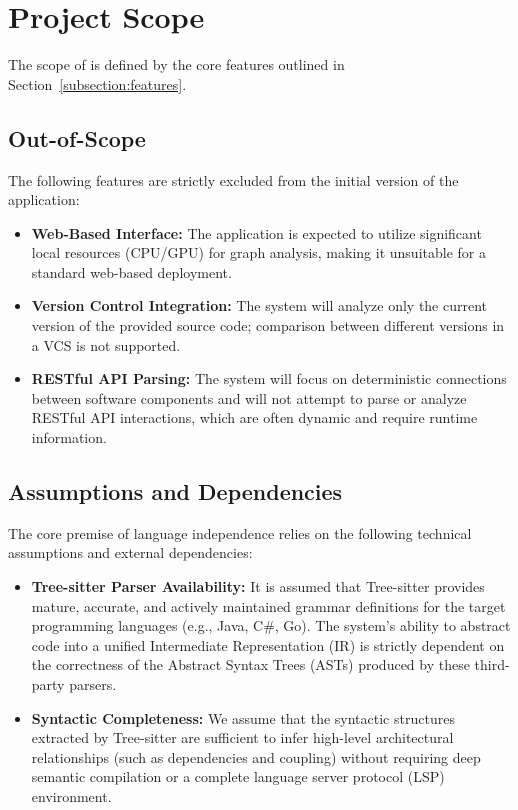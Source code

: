 \section{Project Scope}
\label{section:project-scope}

The scope of \textbf{\usevar{\srsNickName}} is defined by the core features outlined in Section~\ref{subsection:features}.

\subsection{Out-of-Scope}
The following features are strictly excluded from the initial version of the application:
\begin{itemize}
    \item \textbf{Web-Based Interface:} The application is expected to utilize significant local resources (CPU/GPU) for graph analysis, making it unsuitable for a standard web-based deployment.
    \item \textbf{Version Control Integration:} The system will analyze only the current version of the provided source code; comparison between different versions in a VCS is not supported.
    \item \textbf{RESTful API Parsing:} The system will focus on deterministic connections between software components and will not attempt to parse or analyze RESTful API interactions, which are often dynamic and require runtime information.
\end{itemize}

\subsection{Assumptions and Dependencies}
\label{subsection:assumptions}

The core premise of \textbf{\usevar{\srsNickName}} language independence relies on the following technical assumptions and external dependencies:

\begin{itemize}
    \item \textbf{Tree-sitter Parser Availability:} It is assumed that Tree-sitter provides mature, accurate, and actively maintained grammar definitions for the target programming languages (e.g., Java, C\#, Go). The system's ability to abstract code into a unified Intermediate Representation (IR) is strictly dependent on the correctness of the Abstract Syntax Trees (ASTs) produced by these third-party parsers.
    \item \textbf{Syntactic Completeness:} We assume that the syntactic structures extracted by Tree-sitter are sufficient to infer high-level architectural relationships (such as dependencies and coupling) without requiring deep semantic compilation or a complete language server protocol (LSP) environment.
\end{itemize}

